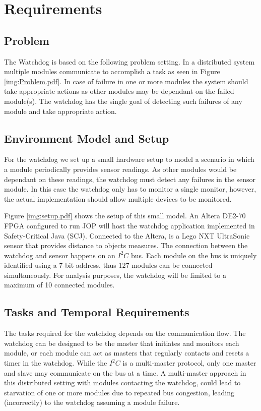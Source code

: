 \chapter{Requirements}
\section{Problem}
The Watchdog is based on the following problem setting. In a distributed system multiple modules communicate to accomplish a task as seen in Figure \ref{img:Problem.pdf}. In case of failure in one or more modules the system should take appropriate actions as other modules may be dependant on the failed module(s). The watchdog has the single goal of detecting such failures of any module and take appropriate action.

\section{Environment Model and Setup}
For the watchdog we set up a small hardware setup to model a scenario in which a module periodically provides sensor readings. As other modules would be dependant on these readings, the watchdog must detect any failures in the sensor module. In this case the watchdog only has to monitor a single monitor, however, the actual implementation should allow multiple devices to be monitored.

Figure \ref{img:setup.pdf} shows the setup of this small model. An Altera DE2-70 FPGA configured to run JOP will host the watchdog application implemented in Safety-Critical Java (SCJ). Connected to the Altera, is a Lego NXT UltraSonic sensor that provides distance to objects measures. The connection between the watchdog and sensor happens on an $\textit{I}^2\textit{C}$ bus. Each module on the bus is uniquely identified using a 7-bit address, thus $127$ modules can be connected simultaneously. For analysis purposes, the watchdog will be limited to a maximum of 10 connected modules.

\section{Tasks and Temporal Requirements}
The tasks required for the watchdog depends on the communication flow. The watchdog can be designed to be the master that initiates and monitors each module, or each module can act as masters that regularly contacts and resets a timer in the watchdog. While the $\textit{I}^2\textit{C}$ is a multi-master protocol, only one master and slave may communicate on the bus at a time.
A multi-master approach in this distributed setting with modules contacting the watchdog, could lead to starvation of one or more modules due to repeated bus congestion, leading (incorrectly) to the watchdog assuming a module failure.

